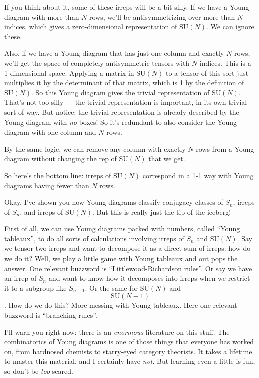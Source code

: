 \documentclass{article}
\begin{document}
If you think about it, some of these irreps will be a bit silly. If we
have a Young diagram with more than \(N\) rows, we'll be
antisymmetrizing over more than \(N\) indices, which gives a
zero-dimensional representation of \(\mathrm{SU}(N)\). We can ignore
these.

Also, if we have a Young diagram that has just one column and exactly
\(N\) rows, we'll get the space of completely antisymmetric tensors with
\(N\) indices. This is a 1-dimensional space. Applying a matrix in
\(\mathrm{SU}(N)\) to a tensor of this sort just multiplies it by the
determinant of that matrix, which is 1 by the definition of
\(\mathrm{SU}(N)\). So this Young diagram gives the trivial
representation of \(\mathrm{SU}(N)\). That's not too silly --- the
trivial representation is important, in its own trivial sort of way. But
notice: the trivial representation is already described by the Young
diagram with \emph{no} boxes! So it's redundant to also consider the
Young diagram with one column and \(N\) rows.

By the same logic, we can remove any column with exactly \(N\) rows from
a Young diagram without changing the rep of \(\mathrm{SU}(N)\) that we
get.

So here's the bottom line: irreps of \(\mathrm{SU}(N)\) correspond in a
1-1 way with Young diagrams having fewer than \(N\) rows.

Okay, I've shown you how Young diagrams classify conjugacy classes of
\(S_n\), irreps of \(S_n\), and irreps of \(\mathrm{SU}(N)\). But this
is really just the tip of the iceberg!

First of all, we can use Young diagrams packed with numbers, called
``Young tableaux'', to do all sorts of calculations involving irreps of
\(S_n\) and \(\mathrm{SU}(N)\). Say we tensor two irreps and want to
decompose it as a direct sum of irreps: how do we do it? Well, we play a
little game with Young tableaux and out pops the answer. One relevant
buzzword is ``Littlewood-Richardson rules''. Or say we have an irrep of
\(S_n\) and want to know how it decomposes into irreps when we restrict
it to a subgroup like \(S_{n-1}\). Or the same for \(\mathrm{SU}(N)\)
and $$\mathrm{SU}(N-1)$$. How do we do this? More messing with Young
tableaux. Here one relevant buzzword is ``branching rules''.

I'll warn you right now: there is an \emph{enormous} literature on this
stuff. The combinatorics of Young diagrams is one of those things that
everyone has worked on, from hardnosed chemists to starry-eyed category
theorists. It takes a lifetime to master this material, and I certainly
have \emph{not}. But learning even a little is fun, so don't be
\emph{too} scared.
\end{document}
